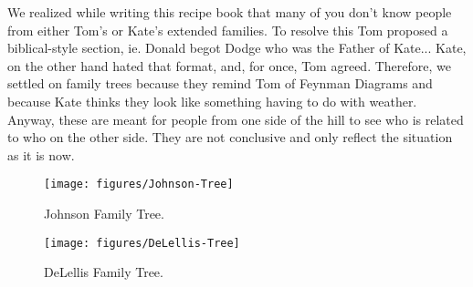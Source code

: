 \documentclass[12pt]{article}
\begin{document}
{\color{red}
We realized while writing this recipe book that many of you don't know people from either Tom's or Kate's extended families.  To resolve this Tom proposed a biblical-style section, ie. Donald begot Dodge who was the Father of Kate...  Kate, on the other hand hated that format, and, for once, Tom agreed.  Therefore, we settled on family trees because they remind Tom of Feynman Diagrams and because Kate thinks they look like something having to do with weather.  Anyway, these are meant for people from one side of the hill to see who is related to who on the other side.
They are not conclusive and only reflect the situation as it is now.
}

\begin{figure}
    \centering
    \texttt{[image: figures/Johnson-Tree]}
    \caption{Johnson Family Tree.}
    \label{fig:johnson-tree}
\end{figure}

\begin{figure}
    \centering
    \texttt{[image: figures/DeLellis-Tree]}
    \caption{DeLellis Family Tree.}
    \label{fig:delellis-tree}
\end{figure}


\printindex
\end{document}
